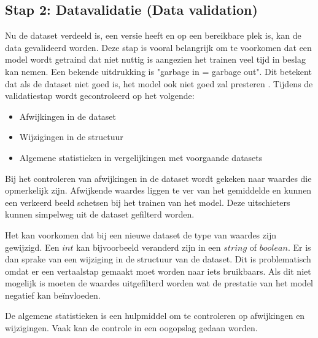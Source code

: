 \subsection{Stap 2: Datavalidatie (Data validation)}\label{subsec:ch4-data-validatie}
Nu de dataset verdeeld is, een versie heeft en op een bereikbare plek is, kan de data gevalideerd worden. Deze stap is vooral belangrijk om te voorkomen dat een model wordt getraind dat niet nuttig is aangezien het trainen veel tijd in beslag kan nemen. Een bekende uitdrukking is "garbage in = garbage out". Dit betekent dat als de dataset niet goed is, het model ook niet goed zal presteren \cite[p.~43]{building-machine-learning-pipelines-oreilly}. Tijdens de validatiestap wordt gecontroleerd op het volgende:

\begin{itemize}
  \item Afwijkingen in de dataset
  \item Wijzigingen in de structuur
  \item Algemene statistieken in vergelijkingen met voorgaande datasets \cite[p.~44]{building-machine-learning-pipelines-oreilly}
\end{itemize}

Bij het controleren van afwijkingen in de dataset wordt gekeken naar waardes die opmerkelijk zijn. Afwijkende waardes liggen te ver van het gemiddelde en kunnen een verkeerd beeld schetsen bij het trainen van het model. Deze uitschieters kunnen simpelweg uit de dataset gefilterd worden.

Het kan voorkomen dat bij een nieuwe dataset de type van waardes zijn gewijzigd. Een \(int\) kan bijvoorbeeld veranderd zijn in een \(string\) of \(boolean\). Er is dan sprake van een wijziging in de structuur van de dataset. Dit is problematisch omdat er een vertaalstap gemaakt moet worden naar iets bruikbaars. Als dit niet mogelijk is moeten de waardes uitgefilterd worden wat de prestatie van het model negatief kan beïnvloeden.

De algemene statistieken is een hulpmiddel om te controleren op afwijkingen en wijzigingen. Vaak kan de controle in een oogopslag gedaan worden. 



